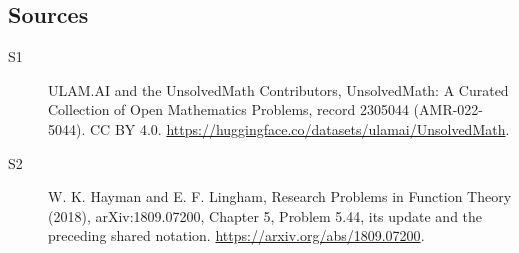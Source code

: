\documentclass[11pt]{article}
\begin{document}
\subsection{Sources}
\begin{description}
\item[\hypertarget{source:2305044:1}{S1}] ULAM.AI and the UnsolvedMath Contributors, UnsolvedMath: A Curated Collection of Open Mathematics Problems, record 2305044 (AMR-022-5044). CC BY 4.0. \url{https://huggingface.co/datasets/ulamai/UnsolvedMath}.
\item[\hypertarget{source:2305044:2}{S2}] W. K. Hayman and E. F. Lingham, Research Problems in Function Theory (2018), arXiv:1809.07200, Chapter 5, Problem 5.44, its update and the preceding shared notation. \url{https://arxiv.org/abs/1809.07200}.
\end{description}
\label{end:2305044}
\end{document}
